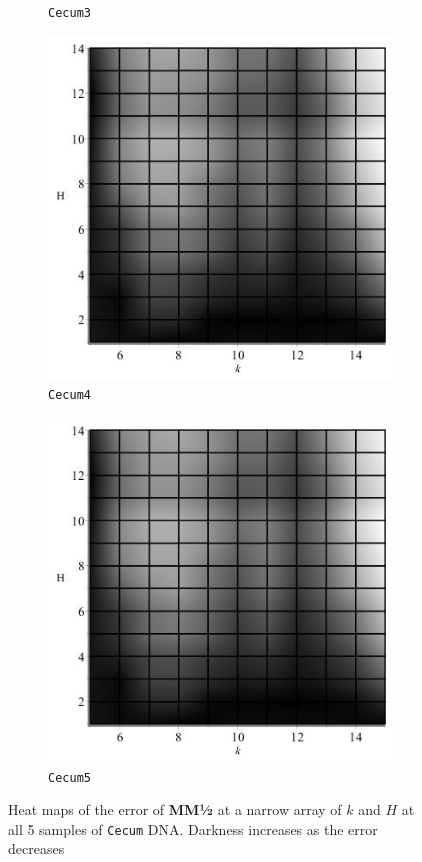 \documentclass[../../main.tex]{subfiles}
\begin{document}
\begin{figure}[H]
\begin{subfigure}[b]{.5\textwidth}
\caption{\texttt{Cecum3}}
\end{subfigure}
\begin{subfigure}[b]{.5\textwidth}
\includegraphics[width=\textwidth]{precision/minmaxhalf/cecum4precise}
\caption{\texttt{Cecum4}}
\end{subfigure}
\begin{subfigure}[b]{.5\textwidth}
\includegraphics[width=\textwidth]{precision/minmaxhalf/cecum5precise}
\caption{\texttt{Cecum5}}
\end{subfigure}
\caption{Heat maps of the error of {\bf MM½} at a narrow array of $k$ and $H$ at all 5 samples of \texttt{Cecum} DNA. Darkness increases as the error decreases}
\label{fig:cpreciseminmaxhalf}
\end{figure}
\end{document}
